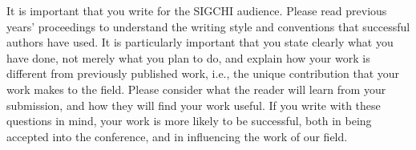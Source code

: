 \documentclass{sigchi}
\begin{document}
It is important that you write for the SIGCHI audience. Please read
previous years' proceedings to understand the writing style and
conventions that successful authors have used. It is particularly
important that you state clearly what you have done, not merely what
you plan to do, and explain how your work is different from previously
published work, i.e., the unique contribution that your work makes to
the field. Please consider what the reader will learn from your
submission, and how they will find your work useful. If you write with
these questions in mind, your work is more likely to be successful,
both in being accepted into the conference, and in influencing the
work of our field.

\balance{}



\end{document}
